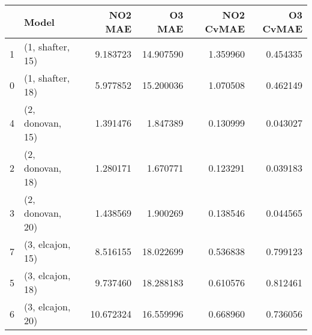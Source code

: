 \begin{tabular}{llrrrr}
\toprule
{} &             Model &    NO2 MAE &     O3 MAE &  NO2 CvMAE &  O3 CvMAE \\
\midrule
1 &  (1, shafter, 15) &   9.183723 &  14.907590 &   1.359960 &  0.454335 \\
0 &  (1, shafter, 18) &   5.977852 &  15.200036 &   1.070508 &  0.462149 \\
4 &  (2, donovan, 15) &   1.391476 &   1.847389 &   0.130999 &  0.043027 \\
2 &  (2, donovan, 18) &   1.280171 &   1.670771 &   0.123291 &  0.039183 \\
3 &  (2, donovan, 20) &   1.438569 &   1.900269 &   0.138546 &  0.044565 \\
7 &  (3, elcajon, 15) &   8.516155 &  18.022699 &   0.536838 &  0.799123 \\
5 &  (3, elcajon, 18) &   9.737460 &  18.288183 &   0.610576 &  0.812461 \\
6 &  (3, elcajon, 20) &  10.672324 &  16.559996 &   0.668960 &  0.736056 \\
\bottomrule
\end{tabular}
